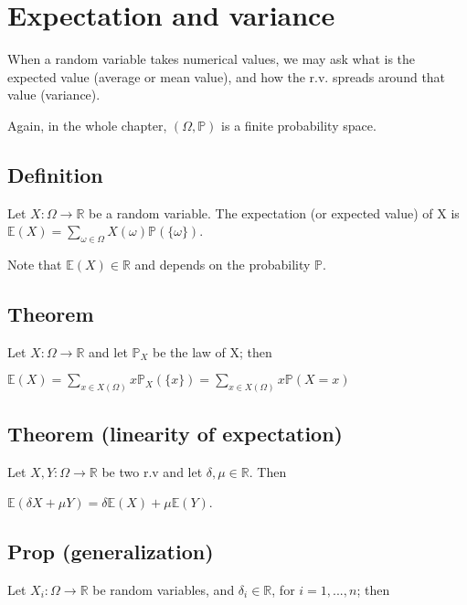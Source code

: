 \section{Expectation and variance}
        When a random variable takes numerical values, we may ask what is the expected value (average or mean value), and how the r.v. spreads around that value (variance).

        Again, in the whole chapter, $(\Omega, \mathbb{P})$ is a finite probability space.

        \subsection{Definition}
            Let $X:\Omega\rightarrow\mathbb{R}$ be a random variable. The expectation (or expected value) of X is $\mathbb{E}(X) = \displaystyle\sum_{\omega\in\Omega} X(\omega)\mathbb{P}(\{\omega\})$.

            \vspace{5pt}

            Note that $\mathbb{E}(X)\in\mathbb{R}$ and depends on the probability $\mathbb{P}$.

        \subsection{Theorem}
            Let $X:\Omega\rightarrow\mathbb{R}$ and let $\mathbb{P}_X$ be the law of X; then

            \vspace{5pt}

            \centerline{$\mathbb{E}(X)=\displaystyle\sum_{x\in X(\Omega)} x \mathbb{P}_X(\{x\}) = \sum_{x\in X(\Omega)} x\mathbb{P}(X=x)$}

        \subsection{Theorem (linearity of expectation)}
            Let $X,Y:\Omega\rightarrow\mathbb{R}$ be two r.v and let $\delta, \mu\in\mathbb{R}$. Then

            \vspace{5pt}

            \centerline{$\mathbb{E}(\delta X+\mu Y) = \delta\mathbb{E}(X) + \mu \mathbb{E}(Y)$.}

        \subsection{Prop (generalization)}
            Let $X_i:\Omega \rightarrow\mathbb{R}$ be random variables, and $\delta_i\in\mathbb{R}$, for $i=1,...,n$; then

